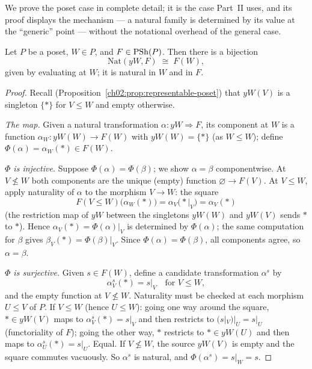 We prove the poset case in complete detail; it is the case Part~II
uses, and its proof displays the mechanism --- a natural family is
determined by its value at the ``generic'' point --- without the
notational overhead of the general case.

\begin{theorem}\label{ch02:thm:yoneda-poset}
Let $P$ be a poset, $W \in P$, and $F \in \mathrm{PSh}(P)$. Then there is a
bijection
\[
\mathrm{Nat}(yW, F) \;\cong\; F(W),
\]
given by evaluating at $W$; it is natural in $W$ and in $F$.
\end{theorem}

\begin{proof}
Recall (Proposition~\ref{ch02:prop:representable-poset}) that $yW(V)$
is a singleton $\{\ast\}$ for $V \le W$ and empty otherwise.

\emph{The map.} Given a natural transformation
$\alpha : yW \Rightarrow F$, its component at $W$ is a function
$\alpha_W : yW(W) \to F(W)$ with $yW(W) = \{\ast\}$ (as $W \le W$);
define $\Phi(\alpha) = \alpha_W(\ast) \in F(W)$.

\emph{$\Phi$ is injective.} Suppose $\Phi(\alpha) = \Phi(\beta)$; we
show $\alpha = \beta$ componentwise. At $V \not\le W$ both components
are the unique (empty) function $\varnothing \to F(V)$. At $V \le W$,
apply naturality of $\alpha$ to the morphism $V \to W$: the square
\[
F(V \le W)\bigl(\alpha_W(\ast)\bigr) = \alpha_V\bigl(\ast|_V\bigr)
= \alpha_V(\ast)
\]
(the restriction map of $yW$ between the singletons $yW(W)$ and
$yW(V)$ sends $\ast$ to $\ast$). Hence
$\alpha_V(\ast) = \Phi(\alpha)|_V$ is determined by $\Phi(\alpha)$;
the same computation for $\beta$ gives
$\beta_V(\ast) = \Phi(\beta)|_V$. Since $\Phi(\alpha) = \Phi(\beta)$,
all components agree, so $\alpha = \beta$.

\emph{$\Phi$ is surjective.} Given $s \in F(W)$, define a candidate
transformation $\alpha^s$ by
\[
\alpha^s_V(\ast) = s|_V \quad \text{for } V \le W,
\]
and the empty function at $V \not\le W$. Naturality must be checked at
each morphism $U \le V$ of $P$. If $V \le W$ (hence $U \le W$): going
one way around the square, $\ast \in yW(V)$ maps to
$\alpha^s_V(\ast) = s|_V$ and then restricts to $(s|_V)|_U = s|_U$
(functoriality of $F$); going the other way, $\ast$ restricts to
$\ast \in yW(U)$ and then maps to $\alpha^s_U(\ast) = s|_U$. Equal. If
$V \not\le W$, the source $yW(V)$ is empty and the square commutes
vacuously. So $\alpha^s$ is natural, and
$\Phi(\alpha^s) = s|_W = s$.


\end{proof}

